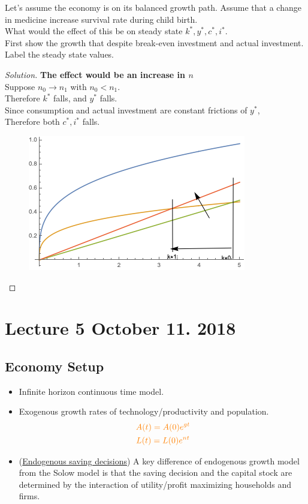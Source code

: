 \documentclass[11pt]{article}
\begin{document}
	    \begin{example}
	    	Let's assume the economy is on its balanced growth path. Assume that a change in medicine increase survival rate during child birth. \\
	    	What would the effect of this be on steady state $k^*, y^*, c^*, i^*$.\\
	    	First show the growth that despite break-even investment and actual investment. Label the steady state values. \\
	    \end{example}
	    
	    \begin{proof}[Solution]
	    	\textbf{The effect would be an increase in $n$} \\
	    	Suppose $n_0 \to n_1$ with $n_0 < n_1$. \\
	    	Therefore $k^*$ falls, and $y^*$ falls. \\
	    	Since consumption and actual investment are constant frictions of $y^*$, \\
	    	Therefore both $c^*, i^*$ falls.
	    	\begin{figure}[h]
	    		\centering
	    		\includegraphics[width=0.7\linewidth]{figures/4_1}
	    	\end{figure}
	    \end{proof}
	
	\section{Lecture 5 October 11. 2018}
	\subsection{Economy Setup}
	\begin{itemize}
		\item Infinite horizon continuous time model.
		\item Exogenous growth rates of technology/productivity and population.
		\begin{gather}
			\textcolor{orange}{A(t) = A(0) e^{gt}} \\
			\textcolor{orange}{L(t) = L(0) e^{nt}}
		\end{gather}
		
		\item (\ul{Endogenous saving decisions}) A key difference of endogenous growth model from the Solow model is that the saving decision and the capital stock are determined by the interaction of utility/profit maximizing households and firms.
	\end{itemize}
	
\end{document}
